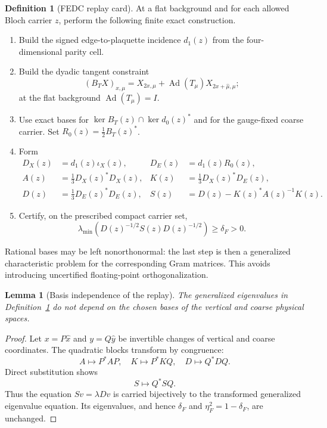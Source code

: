 \documentclass[11pt,oneside]{book}
\newtheorem{lemma}[theorem]{Lemma}
\theoremstyle{definition}
\newtheorem{definition}[theorem]{Definition}
\theoremstyle{remark}
\begin{document}
\begin{definition}[FEDC replay card]
\label{def:e8v15-replay}
At a flat background and for each allowed Bloch carrier \(z\), perform
the following finite exact construction.
\begin{enumerate}
\item Build the signed edge-to-plaquette incidence \(d_1(z)\) from the
four-dimensional parity cell.
\item Build the dyadic tangent constraint
\[
       (B_TX)_{x,\mu}=X_{2x,\mu}
          +\operatorname{Ad}(T_\mu)X_{2x+\hat\mu,\mu};
\]
at the flat background \(\operatorname{Ad}(T_\mu)=I\).
\item Use exact bases for
\(\ker B_T(z)\cap\ker d_0(z)^*\) and for the gauge-fixed coarse
carrier.  Set \(R_0(z)=\frac12B_T(z)^*\).
\item Form
\[
\begin{split}
D_X(z)&=d_1(z)\iota_X(z),&
D_E(z)&=d_1(z)R_0(z),\\
A(z)&=\frac13D_X(z)^*D_X(z),&
K(z)&=\frac13D_X(z)^*D_E(z),\\
D(z)&=\frac13D_E(z)^*D_E(z),&
S(z)&=D(z)-K(z)^*A(z)^{-1}K(z).
\end{split}
\]
\item Certify, on the prescribed compact carrier set,
\[
 \lambda_{\min}\!\left(D(z)^{-1/2}S(z)D(z)^{-1/2}\right)
       \geq\delta_F>0.
\]
\end{enumerate}
Rational bases may be left nonorthonormal: the last step is then a
generalized characteristic problem for the corresponding Gram
matrices.  This avoids introducing uncertified floating-point
orthogonalization.
\end{definition}

\begin{lemma}[Basis independence of the replay]
\label{lem:e8v15-basis}
The generalized eigenvalues in Definition~\ref{def:e8v15-replay} do
not depend on the chosen bases of the vertical and coarse physical
spaces.
\end{lemma}

\begin{proof}
Let \(x=P\widehat x\) and \(y=Q\widehat y\) be invertible changes of
vertical and coarse coordinates.  The quadratic blocks transform by
congruence:
\[
 A\mapsto P^*AP,\quad K\mapsto P^*KQ,\quad
 D\mapsto Q^*DQ.
\]
Direct substitution shows
\[
 S\mapsto Q^*SQ.
\]
Thus the equation \(Sv=\lambda Dv\) is carried bijectively to the
transformed generalized eigenvalue equation.  Its eigenvalues, and
hence \(\delta_F\) and \(\eta_F^2=1-\delta_F\), are unchanged.
\end{proof}
\end{document}
